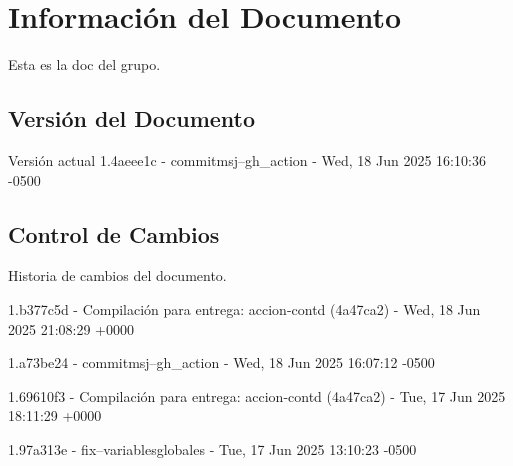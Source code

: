\documentclass[
	a4paper, %
	12pt, %
]{include/CSSullivanBusinessReport}
\begin{document}
\newpage

\begin{twothirdswidth} %
	\tableofcontents %
\end{twothirdswidth}

\newpage


\newpage

\section{Información del
Documento}\label{sec:informaciuxf3n-del-documento}

Esta es la doc del grupo.

\subsection{Versión del Documento}\label{sec:versiuxf3n-del-documento}

\begin{quote}
\end{quote}

Versión actual 1.4aeee1c - commitmsj--gh\_action - Wed, 18 Jun 2025
16:10:36 -0500

\subsection{Control de Cambios}\label{sec:control-de-cambios}

Historia de cambios del documento.

1.b377c5d - Compilación para entrega: accion-contd (4a47ca2) - Wed, 18
Jun 2025 21:08:29 +0000

1.a73be24 - commitmsj--gh\_action - Wed, 18 Jun 2025 16:07:12 -0500

1.69610f3 - Compilación para entrega: accion-contd (4a47ca2) - Tue, 17
Jun 2025 18:11:29 +0000

1.97a313e - fix--variablesglobales - Tue, 17 Jun 2025 13:10:23 -0500
\end{document}
